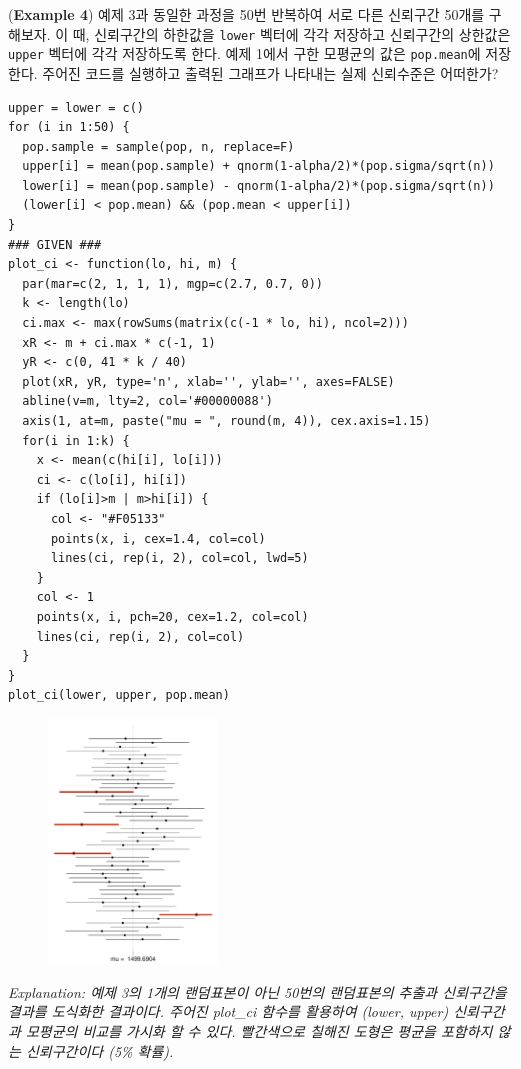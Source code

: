 \documentclass{article}
\begin{document}
(\textbf{Example 4}) 예제 3과 동일한 과정을 50번 반복하여 서로 다른 신뢰구간 50개를 구해보자. 이 때,
신뢰구간의 하한값을 \texttt{lower} 벡터에 각각 저장하고 신뢰구간의 상한값은 \texttt{upper} 벡터에 각각
저장하도록 한다. 예제 1에서 구한 모평균의 값은 \texttt{pop.mean}에 저장한다. 주어진 코드를 실행하고 출력된 그래프가 나타내는 실제 신뢰수준은 어떠한가?
\begin{lstlisting}[style={r-style}]
upper = lower = c()
for (i in 1:50) {
  pop.sample = sample(pop, n, replace=F)
  upper[i] = mean(pop.sample) + qnorm(1-alpha/2)*(pop.sigma/sqrt(n))
  lower[i] = mean(pop.sample) - qnorm(1-alpha/2)*(pop.sigma/sqrt(n))
  (lower[i] < pop.mean) && (pop.mean < upper[i])
}
### GIVEN ###
plot_ci <- function(lo, hi, m) {
  par(mar=c(2, 1, 1, 1), mgp=c(2.7, 0.7, 0))
  k <- length(lo)
  ci.max <- max(rowSums(matrix(c(-1 * lo, hi), ncol=2)))
  xR <- m + ci.max * c(-1, 1)
  yR <- c(0, 41 * k / 40)
  plot(xR, yR, type='n', xlab='', ylab='', axes=FALSE)
  abline(v=m, lty=2, col='#00000088')
  axis(1, at=m, paste("mu = ", round(m, 4)), cex.axis=1.15)
  for(i in 1:k) {
    x <- mean(c(hi[i], lo[i]))
    ci <- c(lo[i], hi[i])
    if (lo[i]>m | m>hi[i]) {
      col <- "#F05133"
      points(x, i, cex=1.4, col=col)
      lines(ci, rep(i, 2), col=col, lwd=5)
    }
    col <- 1
    points(x, i, pch=20, cex=1.2, col=col)
    lines(ci, rep(i, 2), col=col)
  }
}
plot_ci(lower, upper, pop.mean)
\end{lstlisting}
\begin{figure}[htb!]
    \centering
    \includegraphics[width=0.4\textwidth]{fig/ex4.pdf}
\end{figure}
\emph{Explanation: 예제 3의 1개의 랜덤표본이 아닌 50번의 랜덤표본의 추출과 신뢰구간을 결과를 도식화한 결과이다. 주어진 plot\_ci 함수를 활용하여 (lower, upper) 신뢰구간과 모평균의 비교를 가시화 할 수 있다. 빨간색으로 칠해진 도형은 평균을 포함하지 않는 신뢰구간이다 (5\% 확률).}  \\
\end{document}
